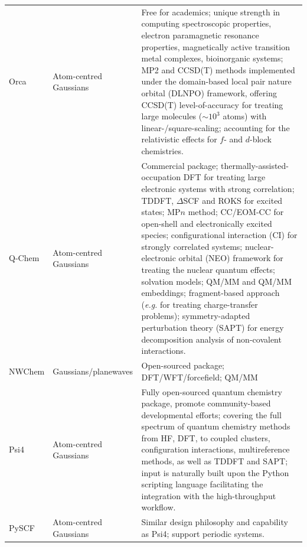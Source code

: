 \begin{longtable}{p{2cm}p{3cm}p{12.5cm}}
      \footnotesize{Orca\cite{neese2020orca}} 
            & \footnotesize{Atom-centred Gaussians}
            & \footnotesize{Free for academics; unique strength in computing spectroscopic properties, electron paramagnetic resonance properties, magnetically active transition metal complexes, bioinorganic systems; MP2 and CCSD(T) methods implemented under the domain-based local pair nature orbital (DLNPO) framework, offering CCSD(T) level-of-accuracy for treating large molecules ($\sim 10^3$ atoms) with linear-/square-scaling; accounting for the relativistic effects for $f$- and $d$-block chemistries.  }\\
     
      \footnotesize{Q-Chem\cite{epifanovsky2021software}}
            & \footnotesize{Atom-centred Gaussians} & \footnotesize{Commercial package; thermally-assisted-occupation DFT for treating large electronic systems with strong correlation; TDDFT, $\Delta$SCF and ROKS for excited states; MP$n$ method; CC/EOM-CC for open-shell and electronically excited species; configurational interaction (CI) for strongly correlated systems; nuclear-electronic orbital (NEO) framework for treating the nuclear quantum effects; solvation models; QM/MM and QM/MM embeddings; fragment-based approach (\emph{e.g.} for treating charge-transfer problems); symmetry-adapted perturbation theory (SAPT) for energy decomposition analysis of non-covalent interactions.}\\
      \footnotesize{NWChem\cite{nwchem}} 
            & \footnotesize{Gaussians/planewaves}
            & \footnotesize{Open-sourced package; DFT/WFT/forcefield; QM/MM}\\
            
      \footnotesize{Psi4\cite{WIRE_Psi4,psi_4}} 
            &  \footnotesize{Atom-centred Gaussians}
            & \footnotesize{Fully open-sourced quantum chemistry package, promote community-based developmental efforts; covering the full spectrum of quantum chemistry methods from HF, DFT, to coupled clusters, configuration interactions, multireference methods, as well as TDDFT and SAPT; input is naturally built upon the Python scripting language facilitating the integration with the high-throughput workflow. }\\

    \footnotesize{PySCF\cite{pyscf_1,pyscf_2}} 
            & \footnotesize{Atom-centred Gaussians}
            & \footnotesize{Similar design philosophy and capability as Psi4; support periodic systems. }\\
            

\end{longtable}
